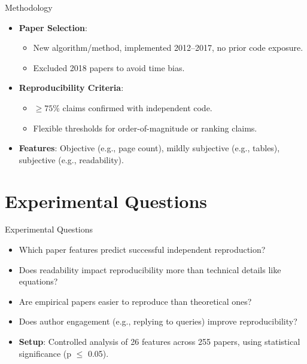 \documentclass[10pt]{beamer}
\begin{document}
\begin{frame}{Methodology}
    \begin{itemize}
        \item \textbf{Paper Selection}:
            \begin{itemize}
                \item New algorithm/method, implemented 2012--2017, no prior code exposure.
                \item Excluded 2018 papers to avoid time bias.
            \end{itemize}
        \item \textbf{Reproducibility Criteria}:
            \begin{itemize}
                \item $\geq 75\%$ claims confirmed with independent code.
                \item Flexible thresholds for order-of-magnitude or ranking claims.
            \end{itemize}
        \item \textbf{Features}: Objective (e.g., page count), mildly subjective (e.g., tables), subjective (e.g., readability).
    \end{itemize}
\end{frame}

\section{Experimental Questions}

\begin{frame}{Experimental Questions}
    \begin{itemize}
        \item Which paper features predict successful independent reproduction?
        \item Does readability impact reproducibility more than technical details like equations?
        \item Are empirical papers easier to reproduce than theoretical ones?
        \item Does author engagement (e.g., replying to queries) improve reproducibility?
        \item \textbf{Setup}: Controlled analysis of 26 features across 255 papers, using statistical significance (p $\leq$ 0.05).
    \end{itemize}
\end{frame}
\end{document}
